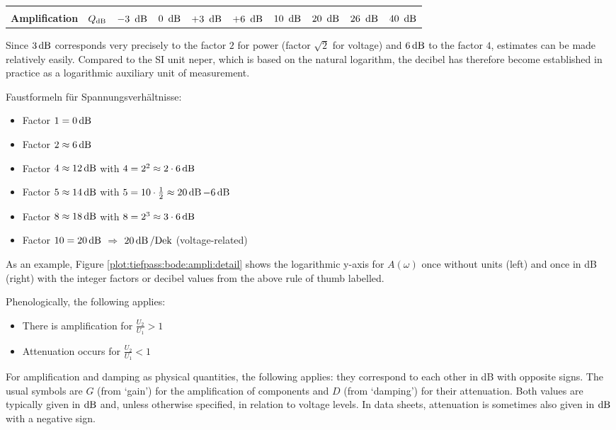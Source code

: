 \begin{frame}
{\begin{table}[H]
\begin{tabular}{ |l c|g|c|g|c|g|c|g|c| }
            \hline &&&&&&&&&\\[-10pt]
                \textbf{Amplification}       & $Q_{\operatorname{dB}}$     &
                $-3\ \operatorname{dB}$ 			    & $0\ \dB$ 	    & $+3\ \operatorname{dB}$ 	& $+6\ \operatorname{dB}$     & $10\ \operatorname{dB}$     & $20\ \operatorname{dB}$     & $26\ \operatorname{dB}$	    & $40\ \operatorname{dB}$ \\[+3pt]
            \hline
        \end{tabular}
    \end{table}%
    Since $3\operatorname{dB}$ corresponds very precisely to the factor $2$ for power (factor $\sqrt{2}$ for voltage) 
    and $6\operatorname{dB}$ to the factor $4$, estimates can be made relatively easily.
    Compared to the SI unit neper, which is based on the natural logarithm, 
    the decibel has therefore become established in practice as a logarithmic auxiliary unit of measurement.

    Faustformeln für Spannungsverhältnisse: 
    \begin{itemize}
        \item Factor $1 = 0\operatorname{dB}$
        \item Factor $2 \approx 6\operatorname{dB}$
        \item Factor $4 \approx 12\operatorname{dB}$ \quad with \quad $4 = 2^2 \approx 2\cdot 6\operatorname{dB}$
        \item Factor $5 \approx 14\operatorname{dB}$ \quad with \quad $5 = 10 \cdot \frac{1}{2} \approx 20\operatorname{dB} - 6\operatorname{dB}$
        \item Factor $8 \approx 18\operatorname{dB}$ \quad with \quad $8=2^3 \approx 3\cdot 6\operatorname{dB}$
        \item Factor $10 = 20\operatorname{dB}$ \quad $\Longrightarrow$ \quad $20 \operatorname{dB} / \mathrm{Dek}$ (voltage-related)
    \end{itemize}    
    
    As an example, Figure \ref{plot:tiefpass:bode:ampli:detail} shows the logarithmic y-axis for $A(\omega)$ 
    once without units (left) and once in dB (right) with the integer factors 
    or decibel values from the above rule of thumb labelled.
    
    Phenologically, the following applies:
    \begin{itemize}
        \item There is amplification for $\frac{U_2}{U_1}>1$
        \item Attenuation occurs for $\frac{U_2}{U_1}<1$
    \end{itemize}
    
    For amplification and damping as physical quantities, the following applies: they correspond to each other in dB with opposite signs.
    The usual symbols are $G$ (from ‘gain’) for the amplification of components and $D$ (from ‘damping’) for their attenuation.
    Both values are typically given in $\operatorname{dB}$ and, unless otherwise specified, in relation to voltage levels.
    In data sheets, attenuation is sometimes also given in $\operatorname{dB}$ with a negative sign.
}

\end{frame}

